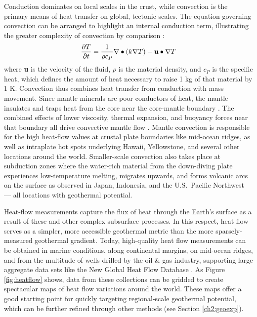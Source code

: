 Conduction dominates on local scales in the crust, while convection is the primary means of heat transfer on global, tectonic scales. The equation governing convection can be arranged to highlight an internal conduction term, illustrating the greater complexity of convection by comparison \citep[p.\ 267]{turcotte_geodynamics_2002}:
\begin{equation}\label{eq:convection}
\frac{\partial T}{\partial t} = \frac{1}{\rho c_P}\nabla\bullet\left(k\nabla T\right)-{\bf u}\bullet\nabla T
\end{equation}
where \textbf{u} is the velocity of the fluid, $\rho$ is the material density, and $c_P$ is the specific heat, which defines the amount of heat necessary to raise 1 kg of that material by $1$ K. Convection thus combines heat transfer from conduction with mass movement. Since mantle minerals are poor conductors of heat, the mantle insulates and traps heat from the core near the core-mantle boundary \citep[p.\ 25]{glassley_geothermal_2015}. The combined effects of lower viscosity, thermal expansion, and buoyancy forces near that boundary all drive convective mantle flow \citep[p.\ 25]{glassley_geothermal_2015}. Mantle convection is responsible for the high heat-flow values at crustal plate boundaries like mid-ocean ridges, as well as intraplate hot spots underlying Hawaii, Yellowstone, and several other locations around the world. Smaller-scale convection also takes place at subduction zones where the water-rich material from the down-diving plate experiences low-temperature melting, migrates upwards, and forms volcanic arcs on the surface as observed in Japan, Indonesia, and the U.S.\ Pacific Northwest \citep[p.\ 31-33]{press_understanding_2004} --– all locations with geothermal potential.

Heat-flow measurements capture the flux of heat through the Earth’s surface as a result of these and other complex subsurface processes. In this respect, heat flow serves as a simpler, more accessible geothermal metric than the more sparsely-measured geothermal gradient. Today, high-quality heat flow measurements can be obtained in marine conditions, along continental margins, on mid-ocean ridges, and from the multitude of wells drilled by the oil \& gas industry, supporting large aggregate data sets like the New Global Heat Flow Database \citep{lucazeau_analysis_2019}. As Figure \ref{fig:heatflow} shows, data from these collections can be gridded to create spectacular maps of heat flow variations around the world. These maps offer a good starting point for quickly targeting regional-scale geothermal potential, which can be further refined through other methods (see Section \ref{ch2:geoexp}).

